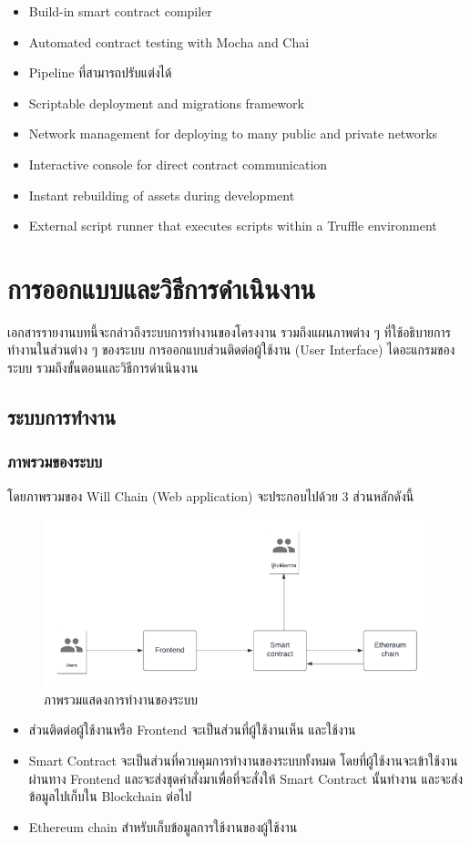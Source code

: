 \documentclass[12pt,oneside,openright,a4paper]{cpe-thai-project}
\begin{document}
	\begin{itemize}[leftmargin=0pt,itemindent=2.5cm]
		\item Build-in smart contract compiler 
		\item Automated contract testing with Mocha and Chai 
		\item Pipeline ที่สามารถปรับแต่งได้ 
		\item Scriptable deployment and migrations framework 
		\item Network management for deploying to many public and private networks 
		\item Interactive console for direct contract communication 
		\item Instant rebuilding of assets during development 
		\item External script runner that executes scripts within a Truffle environment
	\end{itemize}

\chapter{การออกแบบและวิธีการดำเนินงาน}
\tab เอกสารรายงานบทนี้จะกล่าวถึงระบบการทำงานของโครงงาน รวมถึงแผนภาพต่าง ๆ ที่ใช้อธิบายการทำงานในส่วนต่าง ๆ ของระบบ การออกแบบส่วนติดต่อผู้ใช้งาน (User Interface) ไดอะแกรมของระบบ รวมถึงขั้นตอนและวิธีการดำเนินงาน
\section{ระบบการทำงาน}
\subsection{ภาพรวมของระบบ}
\tab โดยภาพรวมของ Will Chain (Web application) จะประกอบไปด้วย 3 ส่วนหลักดังนี้
	\begin{figure}[h]
		\centering
		\includegraphics[scale=0.8]{Overall_system}
		\caption{ภาพรวมแสดงการทำงานของระบบ}
	\end{figure}
	\begin{itemize}[leftmargin=0pt,itemindent=2.5cm]
		\item ส่วนติดต่อผู้ใช้งานหรือ Frontend จะเป็นส่วนที่ผู้ใช้งานเห็น และใช้งาน
		\item Smart Contract จะเป็นส่วนที่ควบคุมการทำงานของระบบทั้งหมด โดยที่ผู้ใช้งานจะเข้าใช้งานผ่านทาง Frontend และจะส่งชุดคำสั่งมาเพื่อที่จะสั่งให้ Smart Contract นั้นทำงาน และจะส่งข้อมูลไปเก็บใน Blockchain ต่อไป
		\item Ethereum chain สำหรับเก็บข้อมูลการใช้งานของผู้ใช้งาน
	\end{itemize}
\end{document}
